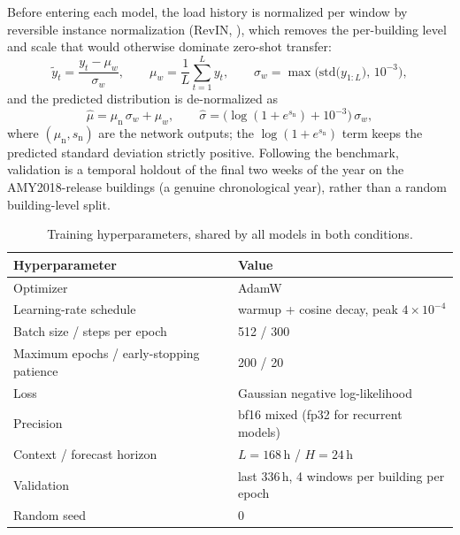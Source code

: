 \documentclass[11pt]{article}
\begin{document}
Before entering each model, the load history is normalized per window by
reversible instance normalization (RevIN, \citealp{revin}), which removes the
per-building level and scale that would otherwise dominate zero-shot transfer:
\begin{equation}
\tilde{y}_t=\frac{y_t-\mu_w}{\sigma_w},\qquad
\mu_w=\frac{1}{L}\sum_{t=1}^{L}y_t,\qquad
\sigma_w=\max\!\Big(\mathrm{std}\big(y_{1:L}\big),\,10^{-3}\Big),
\label{eq:revin}
\end{equation}
and the predicted distribution is de-normalized as
\begin{equation}
\hat{\mu}=\mu_{\mathrm n}\,\sigma_w+\mu_w,\qquad
\hat{\sigma}=\big(\log\!\left(1+e^{s_{\mathrm n}}\right)+10^{-3}\big)\,\sigma_w,
\label{eq:denorm}
\end{equation}
where $(\mu_{\mathrm n},s_{\mathrm n})$ are the network outputs; the
$\log(1+e^{s_{\mathrm n}})$ term keeps the predicted standard deviation strictly
positive. Following the
benchmark, validation is a temporal holdout of the final two weeks of the year on
the AMY2018-release buildings (a genuine chronological year), rather than a
random building-level split.

\begin{table}[H]
\centering
\begin{tabular}{ll}
\toprule
Hyperparameter & Value \\
\midrule
Optimizer & AdamW \\
Learning-rate schedule & warmup + cosine decay, peak $4\times10^{-4}$ \\
Batch size / steps per epoch & 512 / 300 \\
Maximum epochs / early-stopping patience & 200 / 20 \\
Loss & Gaussian negative log-likelihood \\
Precision & bf16 mixed (fp32 for recurrent models) \\
Context / forecast horizon & $L=168$\,h / $H=24$\,h \\
Validation & last 336\,h, 4 windows per building per epoch \\
Random seed & 0 \\
\bottomrule
\end{tabular}
\caption{Training hyperparameters, shared by all models in both
conditions.}
\label{tab:hparams}
\end{table}
\end{document}
